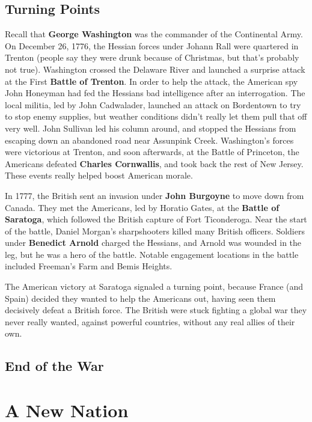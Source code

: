 \subsection*{Turning Points}

Recall that \textbf{George Washington} was the commander of the Continental Army.
On December 26, 1776, the Hessian forces under Johann Rall were quartered in Trenton
(people say they were drunk because of Christmas, but that's probably not true).
Washington crossed the Delaware River and launched a surprise attack at the First \textbf{Battle of Trenton}.
In order to help the attack,
the American spy John Honeyman had fed the Hessians bad intelligence after an interrogation.
The local militia, led by John Cadwalader, launched an attack on Bordentown to try to stop enemy supplies,
but weather conditions didn't really let them pull that off very well.
John Sullivan led his column around,
and stopped the Hessians from escaping down an abandoned road near Assunpink Creek.
Washington's forces were victorious at Trenton,
and soon afterwards, at the Battle of Princeton, the Americans defeated \textbf{Charles Cornwallis},
and took back the rest of New Jersey.
These events really helped boost American morale.

In 1777, the British sent an invasion under \textbf{John Burgoyne} to move down from Canada.
They met the Americans, led by Horatio Gates, at the \textbf{Battle of Saratoga},
which followed the British capture of Fort Ticonderoga.
Near the start of the battle, Daniel Morgan's sharpshooters killed many British officers.
Soldiers under \textbf{Benedict Arnold} charged the Hessians,
and Arnold was wounded in the leg, but he was a hero of the battle.
Notable engagement locations in the battle included Freeman's Farm and Bemis Heights.

The American victory at Saratoga signaled a turning point,
because France (and Spain) decided they wanted to help the Americans out,
having seen them decisively defeat a British force.
The British were stuck fighting a global war they never really wanted,
against powerful countries, without any real allies of their own.

\subsection*{End of the War}

\section{A New Nation}

